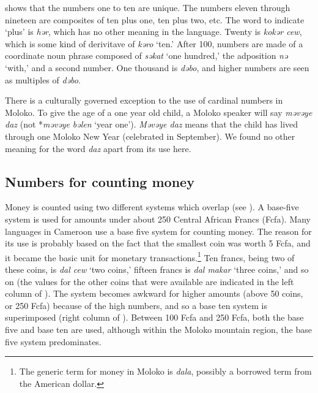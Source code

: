  shows that the numbers one to ten are unique. The numbers eleven through nineteen are composites of ten plus one, ten plus two, etc. The word to indicate ‘plus’ is \textit{hər}, which has no other meaning in the language. Twenty is \textit{kokər cew}, which is some kind of derivitave of \textit{kəro}  ‘ten.’ After 100, numbers are made of a coordinate noun phrase composed of  \textit{səkat} ‘one hundred,’ the adposition \textit{nə} ‘with,’ and a second number. One thousand is \textit{dəbo}, and higher numbers are seen as multiples of \textit{dəbo}.

There is a culturally governed exception to the use of cardinal numbers in Moloko.  To give the age of a one year old child, a Moloko speaker will say \textit{məvəye daz} (not *\textit{məvəye} \textit{bəlen} ‘year one’). \textit{Məvəye daz} means that the child has lived through one Moloko New Year (celebrated in September). We found no other meaning for the word \textit{daz}  apart from its use here. 

\subsection{Numbers for counting money}\label{sec:3.3.2}
\hypertarget{RefHeading1211061525720847}{}
Money is counted using two different systems which overlap (see ). A base-five system is used for amounts under about 250 Central African Francs (Fcfa). Many languages in Cameroon use a base five system for counting money. The reason for its use is probably based on the fact that the smallest coin was worth 5 Fcfa, and it became the basic unit for monetary transactions.\footnote{The generic term for money in Moloko is \textit{dala}, possibly a borrowed term from the American dollar.} Ten francs, being two of these coins, is \textit{dal cew} ‘two coins,’ fifteen francs is \textit{dal makar} ‘three coins,’ and so on (the values for the other coins that were available are indicated in the left column of ). The system becomes awkward for higher amounts (above 50 coins, or 250 Fcfa) because of the high numbers, and so a base ten system is superimposed (right column of ). Between 100 Fcfa and 250 Fcfa, both the base five and base ten are used, although within the Moloko mountain region, the base five system predominates. 

